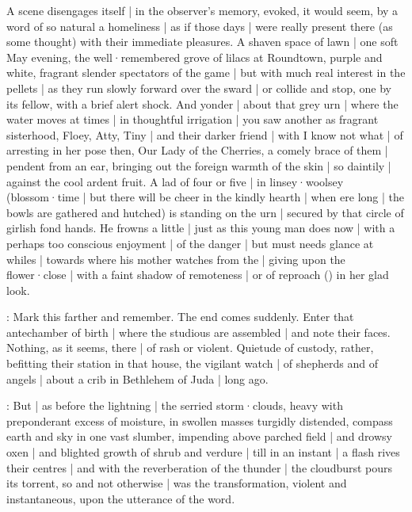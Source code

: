 A scene disengages itself |
in the observer's memory,
evoked,
it would seem,
by a word of so natural a homeliness |
as if those days |
were really present there
(as some thought)
with their immediate pleasures.
A shaven space of lawn |
one soft May evening,
the well·remembered grove of lilacs at Roundtown,
purple and white,
fragrant slender spectators of the game |
but with much real interest in the pellets |
as they run slowly forward over the sward |
or collide and stop,
one by its fellow,
with a brief alert shock.
And yonder |
about that grey urn |
where the water moves at times |
in thoughtful irrigation |
you saw another as fragrant sisterhood,
Floey,
Atty,
Tiny |
and their darker friend |
with I know not what |
of arresting in her pose then,
Our Lady of the Cherries,
a comely brace of them |
pendent from an ear,
bringing out the foreign warmth of the skin |
so daintily |
against the cool ardent fruit.
A lad of four or five |
in linsey·woolsey
(blossom·time |
but there will be cheer in the kindly hearth |
when ere long |
the bowls are gathered and hutched)
is standing on the urn |
secured by that circle of girlish fond hands.
He frowns a little |
just as this young man does now |
with a perhaps too conscious enjoyment |
of the danger |
but must needs glance at whiles |
towards where his mother watches from the  |
giving upon the flower·close |
with a faint shadow of remoteness |
or of reproach
()
in her glad look.


:
Mark this farther and remember.
The end comes suddenly.
Enter that antechamber of birth |
where the studious are assembled |
and note their faces.
Nothing,
as it seems,
there |
of rash or violent.
Quietude of custody,
rather,
befitting their station in that house,
the vigilant watch |
of shepherds and of angels |
about a crib in Bethlehem of Juda |
long ago.

:
But |
as before the lightning |
the serried storm·clouds,
heavy with preponderant excess of moisture,
in swollen masses turgidly distended,
compass earth and sky in one vast slumber,
impending above parched field |
and drowsy oxen |
and blighted growth of shrub and verdure |
till in an instant |
a flash rives their centres |
and with the reverberation of the thunder |
the cloudburst pours its torrent,
so and not otherwise |
was the transformation,
violent and instantaneous,
upon the utterance of the word.


